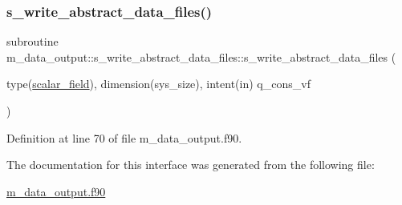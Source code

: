 \subsubsection{\texorpdfstring{s\+\_\+write\+\_\+abstract\+\_\+data\+\_\+files()}{s\_write\_abstract\_data\_files()}}
{\footnotesize\ttfamily subroutine m\+\_\+data\+\_\+output\+::s\+\_\+write\+\_\+abstract\+\_\+data\+\_\+files\+::s\+\_\+write\+\_\+abstract\+\_\+data\+\_\+files (\begin{DoxyParamCaption}\item[{type(\hyperlink{structm__derived__types_1_1scalar__field}{scalar\+\_\+field}), dimension(sys\+\_\+size), intent(in)}]{q\+\_\+cons\+\_\+vf }\end{DoxyParamCaption})}



Definition at line 70 of file m\+\_\+data\+\_\+output.\+f90.



The documentation for this interface was generated from the following file\+:\begin{DoxyCompactItemize}
\item 
\hyperlink{m__data__output_8f90}{m\+\_\+data\+\_\+output.\+f90}\end{DoxyCompactItemize}
